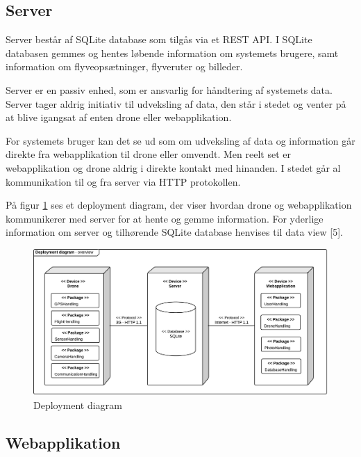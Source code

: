 \newpage 

\subsection{Server}

Server består af SQLite database som tilgås via et REST API. I SQLite databasen gemmes og hentes løbende information om systemets brugere, samt information om flyveopsætninger, flyveruter og billeder.  

Server er en passiv enhed, som er ansvarlig for håndtering af systemets data. Server tager aldrig initiativ til udveksling af data, den står i stedet og venter på at blive igangsat af enten drone eller webapplikation.

For systemets bruger kan det se ud som om udveksling af data og information går direkte fra webapplikation til drone eller omvendt. Men reelt set er webapplikation og drone aldrig i direkte kontakt med hinanden. I stedet går al kommunikation til og fra server via HTTP protokollen. 

På figur \ref{fig:deployment_diagram} ses et deployment diagram, der viser hvordan drone og webapplikation kommunikerer med server for at hente og gemme information. For yderlige information om server og tilhørende SQLite database henvises til data view [5].

\begin{figure}[H]
\centering
\includegraphics[width=1\textwidth]{Billeder/deployment_overview.png}
\vspace{-0.5cm}
\caption{Deployment diagram}
\label{fig:deployment_diagram}
\end{figure}
 
\newpage


\subsection{Webapplikation}

